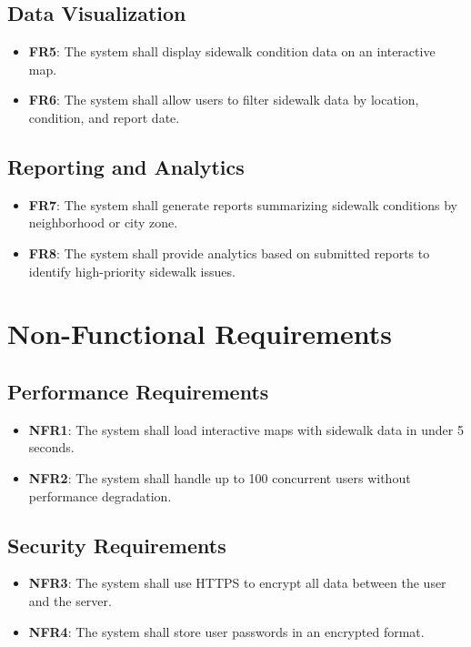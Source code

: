 \documentclass[a4paper,12pt]{article}
\begin{document}
\subsection{Data Visualization}
\begin{itemize}
    \item \textbf{FR5}: The system shall display sidewalk condition data on an interactive map.
    \item \textbf{FR6}: The system shall allow users to filter sidewalk data by location, condition, and report date.
\end{itemize}

\subsection{Reporting and Analytics}
\begin{itemize}
    \item \textbf{FR7}: The system shall generate reports summarizing sidewalk conditions by neighborhood or city zone.
    \item \textbf{FR8}: The system shall provide analytics based on submitted reports to identify high-priority sidewalk issues.
\end{itemize}

\newpage
\section{Non-Functional Requirements}

\subsection{Performance Requirements}
\begin{itemize}
    \item \textbf{NFR1}: The system shall load interactive maps with sidewalk data in under 5 seconds.
    \item \textbf{NFR2}: The system shall handle up to 100 concurrent users without performance degradation.
\end{itemize}

\subsection{Security Requirements}
\begin{itemize}
    \item \textbf{NFR3}: The system shall use HTTPS to encrypt all data between the user and the server.
    \item \textbf{NFR4}: The system shall store user passwords in an encrypted format.
\end{itemize}
\end{document}
